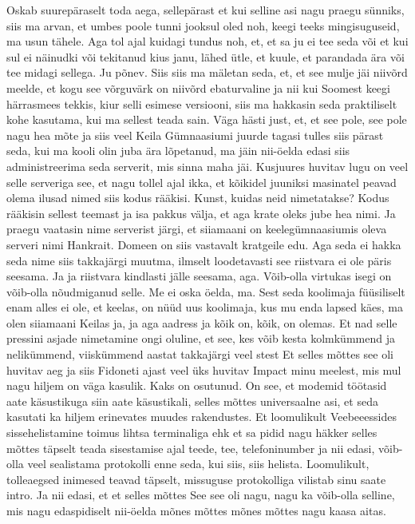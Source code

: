Oskab suurepäraselt toda aega, sellepärast et kui selline asi nagu praegu sünniks, siis ma arvan, et umbes poole tunni jooksul oled noh, keegi teeks mingisuguseid, ma usun tähele. Aga tol ajal kuidagi tundus noh, et, et sa ju ei tee seda või et kui sul ei näinudki või tekitanud kius janu, lähed ütle, et kuule, et parandada ära või tee midagi sellega. Ju põnev.
Siis siis ma mäletan seda, et, et see mulje jäi niivõrd meelde, et kogu see võrguvärk on niivõrd ebaturvaline ja nii kui Soomest keegi härrasmees tekkis, kiur selli esimese versiooni, siis ma hakkasin seda praktiliselt kohe kasutama, kui ma sellest teada sain. Väga hästi just, et, et see pole, see pole nagu hea mõte ja siis veel Keila Gümnaasiumi juurde tagasi tulles siis pärast seda, kui ma kooli olin juba ära lõpetanud, ma jäin nii-öelda edasi siis administreerima seda serverit, mis sinna maha jäi. Kusjuures huvitav lugu on veel selle serveriga see, et nagu tollel ajal ikka, et kõikidel juuniksi masinatel peavad olema ilusad nimed siis kodus rääkisi.
Kunst, kuidas neid nimetatakse?
Kodus rääkisin sellest teemast ja isa pakkus välja, et aga krate oleks jube hea nimi. Ja praegu vaatasin nime serverist järgi, et siiamaani on keelegümnaasiumis oleva serveri nimi Hankrait. Domeen on siis vastavalt kratgeile edu.
Aga seda ei hakka seda nime siis takkajärgi muutma, ilmselt loodetavasti see riistvara ei ole päris seesama.
Ja ja riistvara kindlasti jälle seesama, aga.
Võib-olla virtukas isegi on võib-olla nõudmiganud selle.
Me ei oska öelda, ma.
Sest seda koolimaja füüsiliselt enam alles ei ole, et keelas, on nüüd uus koolimaja, kus mu enda lapsed käes, ma olen siiamaani Keilas ja, ja aga aadress ja kõik on, kõik, on olemas.
Et nad selle pressini asjade nimetamine ongi oluline, et see, kes võib kesta kolmkümmend ja nelikümmend, viiskümmend aastat takkajärgi veel stest
Et selles mõttes see oli huvitav aeg ja siis Fidoneti ajast veel üks huvitav Impact minu meelest, mis mul nagu hiljem on väga kasulik.
Kaks on osutunud.
On see, et modemid töötasid aate käsustikuga siin aate käsustikali, selles mõttes universaalne asi, et seda kasutati ka hiljem erinevates muudes rakendustes. Et loomulikult Veebeeessides sissehelistamine toimus lihtsa terminaliga ehk et sa pidid nagu häkker selles mõttes täpselt teada sisestamise ajal teede, tee, telefoninumber ja nii edasi, võib-olla veel sealistama protokolli enne seda, kui siis, siis helista. Loomulikult, tolleaegsed inimesed teavad täpselt, missuguse protokolliga vilistab sinu saate intro.
Ja nii edasi, et et selles mõttes
See see oli nagu, nagu ka võib-olla selline, mis nagu edaspidiselt nii-öelda mõnes mõttes mõnes mõttes nagu kaasa aitas.

